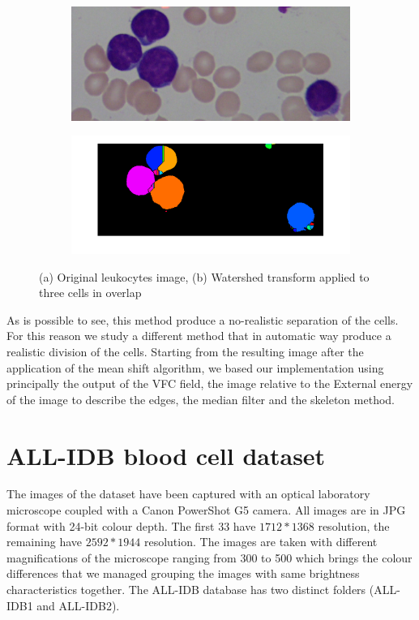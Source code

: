 \begin{figure}
	\centering
	\begin{subfigure}[b]{0.5\textwidth}
        \includegraphics[width=\textwidth]{img/Im007_1_crop.png}
        \caption{ }
        \label{fig:origimage}
    \end{subfigure}
    \begin{subfigure}[b]{0.5\textwidth}
		\includegraphics[width=\textwidth]{img/waterTrRes.png}
		\caption{ }
		\label{fig:watershedoncells}
	\end{subfigure}
	\caption{(a) Original leukocytes image, (b) Watershed transform applied to three cells in overlap}
	\label{fig:exOnImage7}
\end{figure}
As is possible to see, this method produce a no-realistic separation of the cells. For this reason we study a different method that in automatic way produce a realistic division of the cells. Starting from the resulting image after the application of the mean shift algorithm, we based our implementation using principally the output of the VFC field, the image relative to the External energy of the image to describe the edges, the median filter and the skeleton method.
\section{ALL-IDB blood cell dataset}
The images of the dataset have been captured with an optical laboratory microscope coupled with
a Canon PowerShot G5 camera. All images are in JPG format with 24-bit colour depth. The first 33
have $1712*1368$ resolution, the remaining have $2592*1944$ resolution. The images are taken with
different magnifications of the microscope ranging from 300 to 500 which brings the colour
differences that we managed grouping the images with same brightness characteristics together. The
ALL-IDB database has two distinct folders (ALL-IDB1 and ALL-IDB2).

